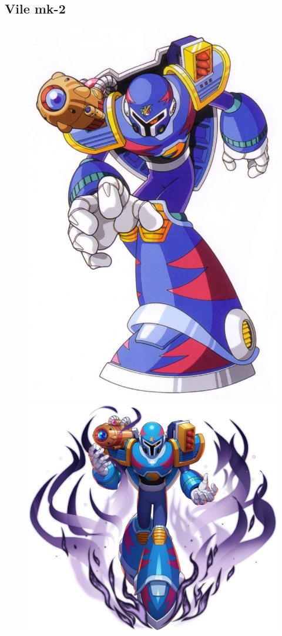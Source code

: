 \subsection{Vile mk-2}\label{boss:Vile2} 
\begin{figure}[htp]
	\centering
	\includegraphics[height=\portraitsize]{figures/X3/Doppler_stages/vile2.png}
	\includegraphics[height=\portraitsize]{figures/X3/Doppler_stages/vile2_dive.png}

\end{figure}
